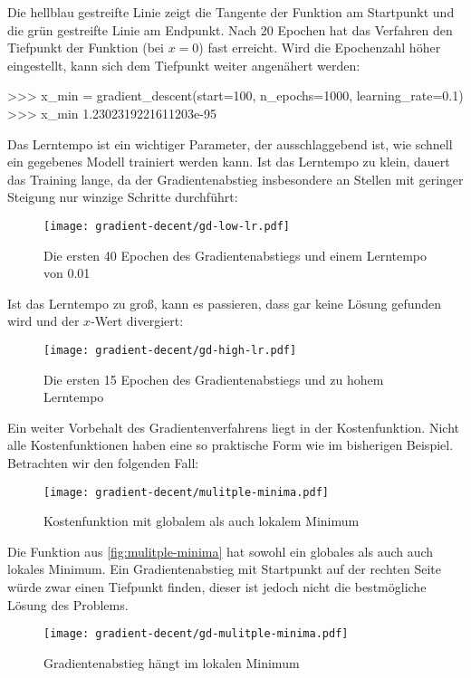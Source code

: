 \noindent
Die hellblau gestreifte Linie zeigt die Tangente der Funktion am Startpunkt und
die grün gestreifte Linie am Endpunkt. Nach 20 Epochen hat das Verfahren
den Tiefpunkt der Funktion (bei $x = 0$) fast erreicht.
Wird die Epochenzahl höher eingestellt, kann sich dem Tiefpunkt weiter angenähert werden:
\begin{pyconcode}
>>> x_min = gradient_descent(start=100, n_epochs=1000, learning_rate=0.1)
>>> x_min
1.2302319221611203e-95
\end{pyconcode}
Das Lerntempo ist ein wichtiger Parameter, der ausschlaggebend ist,
wie schnell ein gegebenes Modell trainiert werden kann.
Ist das Lerntempo zu klein, dauert das Training lange,
da der Gradientenabstieg insbesondere an Stellen mit geringer Steigung nur
winzige Schritte durchführt:
\begin{figure}[h!]
  \centering
  \texttt{[image: gradient-decent/gd-low-lr.pdf]}
  \caption{Die ersten 40 Epochen des Gradientenabstiegs und einem Lerntempo von \num{0.01}}
  \label{fig:gd-low-lr}
\end{figure}

\noindent
Ist das Lerntempo zu groß, kann es passieren, dass gar keine Lösung gefunden wird
und der $x$-Wert divergiert:
\newpage
\begin{figure}[h!]
  \centering
  \texttt{[image: gradient-decent/gd-high-lr.pdf]}
  \caption{Die ersten 15 Epochen des Gradientenabstiegs und zu hohem Lerntempo}
  \label{fig:gd-high-lr}
\end{figure}

\noindent
Ein weiter Vorbehalt des Gradientenverfahrens liegt in der Kostenfunktion.
Nicht alle Kostenfunktionen haben eine so praktische Form wie im bisherigen Beispiel.
Betrachten wir den folgenden Fall:
\begin{figure}[h!]
  \centering
  \texttt{[image: gradient-decent/mulitple-minima.pdf]}
  \caption{Kostenfunktion mit globalem als auch lokalem Minimum}
  \label{fig:mulitple-minima}
\end{figure}

\noindent
Die Funktion aus \autoref{fig:mulitple-minima} hat sowohl ein globales als auch auch
lokales Minimum. Ein Gradientenabstieg mit Startpunkt auf der rechten Seite würde
zwar einen Tiefpunkt finden, dieser ist jedoch nicht die bestmögliche Lösung des Problems.
\begin{figure}[h!]
  \centering
  \texttt{[image: gradient-decent/gd-mulitple-minima.pdf]}
  \caption{Gradientenabstieg hängt im lokalen Minimum}
  \label{fig:gd-mulitple-minima}
\end{figure}

